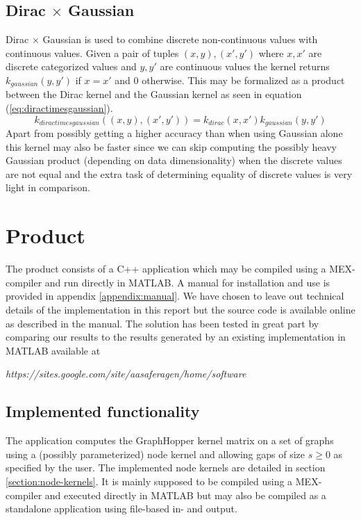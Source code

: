 \documentclass{article}
\begin{document}
\subsection{Dirac $\times$ Gaussian}
Dirac $\times$ Gaussian is used to combine discrete non-continuous values with continuous values. Given a pair of tuples $(x,y),(x',y')$ where $x,x'$ are discrete categorized values and $y,y'$ are continuous values the kernel returns $k_{gaussian}(y,y')$ if $x=x'$ and 0 otherwise. This may be formalized as a product between the Dirac kernel and the Gaussian kernel as seen in equation (\ref{eq:diractimesgaussian}).
\begin{equation}
\label{eq:diractimesgaussian}
k_{diractimesgaussian}((x,y), (x',y')) = k_{dirac}(x, x') k_{gaussian}(y, y')
\end{equation}
Apart from possibly getting a higher accuracy than when using Gaussian alone this kernel may also be faster since we can skip computing the possibly heavy Gaussian product (depending on data dimensionality) when the discrete values are not equal and the extra task of determining equality of discrete values is very light in comparison.

\section{Product}
The product consists of a C++ application which may be compiled using a MEX-compiler and run directly in MATLAB. A manual for installation and use is provided in appendix \ref{appendix:manual}. We have chosen to leave out technical details of the implementation in this report but the source code is available online as described in the manual. The solution has been tested in great part by comparing our results to the results generated by an existing implementation in MATLAB available at

\textit{https://sites.google.com/site/aasaferagen/home/software} 

\subsection{Implemented functionality}
The application computes the GraphHopper kernel matrix on a set of graphs using a (possibly parameterized) node kernel and allowing gaps of size $s\geq 0$ as specified by the user. The implemented node kernels are detailed in section \ref{section:node-kernels}. It is mainly supposed to be compiled using a MEX-compiler and executed directly in MATLAB but may also be compiled as a standalone application using file-based in- and output.
\end{document}
